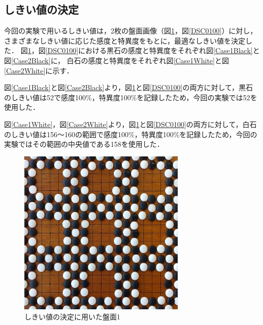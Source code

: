 \documentclass[openright]{nitocs}
\numberwithin{equation}{section}
\begin{document}
        \subsection{しきい値の決定} \label{threshold}
            今回の実験で用いるしきい値は，2枚の盤面画像（図\ref{DSC0087}，図\ref{DSC0100}）に対し，さまざまなしきい値に応じた感度と特異度をもとに，最適なしきい値を決定した．
            図\ref{DSC0087}，図\ref{DSC0100}における黒石の感度と特異度をそれぞれ図\ref{Case1Black}と図\ref{Case2Black}に，
            白石の感度と特異度をそれぞれ図\ref{Case1White}と図\ref{Case2White}に示す．

            図\ref{Case1Black}と図\ref{Case2Black}より，図\ref{DSC0087}と図\ref{DSC0100}の両方に対して，黒石のしきい値は52で感度100\%，特異度100\%を記録したため，今回の実験では52を使用した．

            図\ref{Case1White}，図\ref{Case2White}より，図\ref{DSC0087}と図\ref{DSC0100}の両方に対して，白石のしきい値は156～160の範囲で感度100\%，特異度100\%を記録したため，今回の実験ではその範囲の中央値である158を使用した．
            \begin{figure}[tb] %
                \begin{center}
                \includegraphics[clip,width=80mm]{DSC_0087/boardImg.jpg} 
                \caption{しきい値の決定に用いた盤面1}
                \label{DSC0087}
                \end{center}
            \end{figure}
\end{document}
